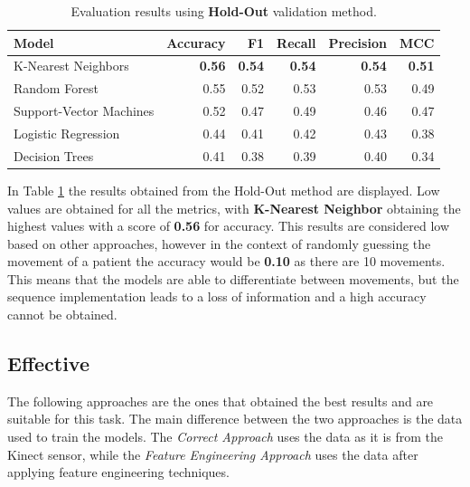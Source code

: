                 \begin{table}[htbp]
                    \centering
                    \caption{Evaluation results using \textbf{Hold-Out} validation method.}
                    \label{tab:sequence_approach_holdout}
                    \begin{tabular}{lrrrrr}
                        \toprule
                        \textbf{Model} & \textbf{Accuracy} & \textbf{F1} & \textbf{Recall} & \textbf{Precision} & \textbf{MCC} \\
                        \midrule
                        K-Nearest Neighbors & \textbf{0.56} & \textbf{0.54} & \textbf{0.54} & \textbf{0.54} & \textbf{0.51} \\
                        Random Forest & 0.55 & 0.52 & 0.53 & 0.53 & 0.49 \\
                        Support-Vector Machines& 0.52 & 0.47 & 0.49 & 0.46 & 0.47 \\
                        Logistic Regression & 0.44 & 0.41 & 0.42 & 0.43 & 0.38 \\
                        Decision Trees & 0.41 & 0.38 & 0.39 & 0.40 & 0.34 \\
                        \bottomrule
                    \end{tabular}
                \end{table}

                In Table \ref{tab:sequence_approach_holdout} the results obtained from the Hold-Out method are displayed. Low values are obtained for all the metrics, with \textbf{K-Nearest Neighbor} obtaining the highest values with a score of \textbf{0.56} for accuracy. This results are considered low based on other approaches, however in the context of randomly guessing the movement of a patient the accuracy would be \textbf{0.10} as there are 10 movements. This means that the models are able to differentiate between movements, but the sequence implementation leads to a loss of information and a high accuracy cannot be obtained.

        \subsection{Effective}

                The following approaches are the ones that obtained the best results and are suitable for this task. The main difference between the two approaches is the data used to train the models. The \textit{Correct Approach} uses the data as it is from the Kinect sensor, while the \textit{Feature Engineering Approach} uses the data after applying feature engineering techniques.
                
